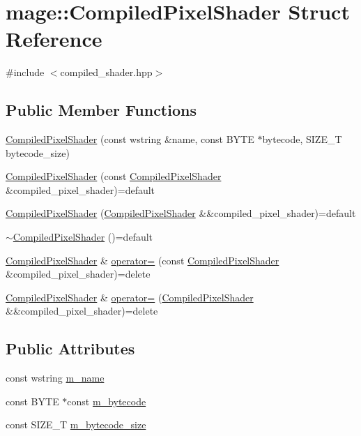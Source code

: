 \hypertarget{structmage_1_1_compiled_pixel_shader}{}\section{mage\+:\+:Compiled\+Pixel\+Shader Struct Reference}
\label{structmage_1_1_compiled_pixel_shader}


{\ttfamily \#include $<$compiled\+\_\+shader.\+hpp$>$}

\subsection*{Public Member Functions}
\begin{DoxyCompactItemize}
\item 
\hyperlink{structmage_1_1_compiled_pixel_shader_abedab6ae2f5acbb5054e78abe40709e9}{Compiled\+Pixel\+Shader} (const wstring \&name, const B\+Y\+TE $\ast$bytecode, S\+I\+Z\+E\+\_\+T bytecode\+\_\+size)
\item 
\hyperlink{structmage_1_1_compiled_pixel_shader_a5d749d97595bc9569dfd73d3411be4b5}{Compiled\+Pixel\+Shader} (const \hyperlink{structmage_1_1_compiled_pixel_shader}{Compiled\+Pixel\+Shader} \&compiled\+\_\+pixel\+\_\+shader)=default
\item 
\hyperlink{structmage_1_1_compiled_pixel_shader_a472407078fe751a18d8c2ffe6e6bbef5}{Compiled\+Pixel\+Shader} (\hyperlink{structmage_1_1_compiled_pixel_shader}{Compiled\+Pixel\+Shader} \&\&compiled\+\_\+pixel\+\_\+shader)=default
\item 
\hyperlink{structmage_1_1_compiled_pixel_shader_aa108e83f2afcc6ade97f3dbaa526dee1}{$\sim$\+Compiled\+Pixel\+Shader} ()=default
\item 
\hyperlink{structmage_1_1_compiled_pixel_shader}{Compiled\+Pixel\+Shader} \& \hyperlink{structmage_1_1_compiled_pixel_shader_a0dde38701c2e15a52d5d80f992a32551}{operator=} (const \hyperlink{structmage_1_1_compiled_pixel_shader}{Compiled\+Pixel\+Shader} \&compiled\+\_\+pixel\+\_\+shader)=delete
\item 
\hyperlink{structmage_1_1_compiled_pixel_shader}{Compiled\+Pixel\+Shader} \& \hyperlink{structmage_1_1_compiled_pixel_shader_a347557ae3d91dd0d561c56bc2c811a2f}{operator=} (\hyperlink{structmage_1_1_compiled_pixel_shader}{Compiled\+Pixel\+Shader} \&\&compiled\+\_\+pixel\+\_\+shader)=delete
\end{DoxyCompactItemize}
\subsection*{Public Attributes}
\begin{DoxyCompactItemize}
\item 
const wstring \hyperlink{structmage_1_1_compiled_pixel_shader_ae87a10c9288429db9a607182a0ef2b39}{m\+\_\+name}
\item 
const B\+Y\+TE $\ast$const \hyperlink{structmage_1_1_compiled_pixel_shader_a75f72532dcde21b055bc24989fdb6c51}{m\+\_\+bytecode}
\item 
const S\+I\+Z\+E\+\_\+T \hyperlink{structmage_1_1_compiled_pixel_shader_ab35073e4116ee4ccb8dd07d1e7d0c14a}{m\+\_\+bytecode\+\_\+size}
\end{DoxyCompactItemize}


